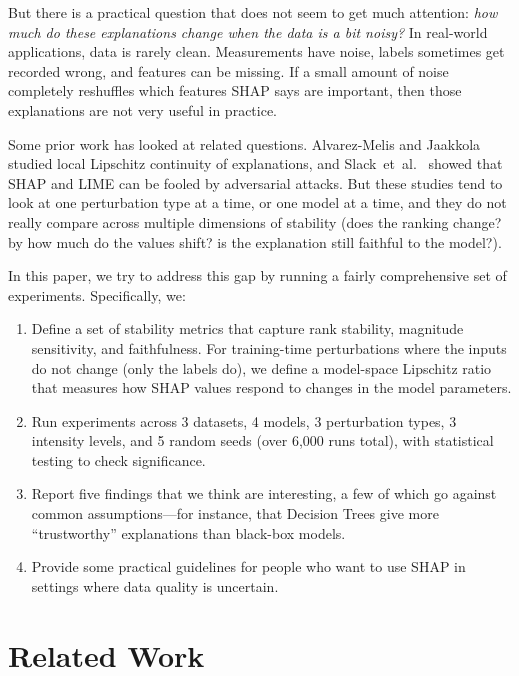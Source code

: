\documentclass[10pt,twocolumn]{article}
\begin{document}
But there is a practical question that does not seem to get much
attention: \emph{how much do these explanations change when the
data is a bit noisy?} In real-world applications, data is rarely
clean. Measurements have noise, labels sometimes get recorded
wrong, and features can be missing. If a small amount of noise
completely reshuffles which features SHAP says are important, then
those explanations are not very useful in practice.

Some prior work has looked at related questions.
Alvarez-Melis and Jaakkola~\cite{alvarez2018robustness} studied
local Lipschitz continuity of explanations, and
Slack~et~al.~\cite{slack2020fooling} showed that SHAP and LIME can
be fooled by adversarial attacks. But these studies tend to look at
one perturbation type at a time, or one model at a time, and they
do not really compare across multiple dimensions of stability
(does the ranking change? by how much do the values shift? is the
explanation still faithful to the model?).

In this paper, we try to address this gap by running a fairly
comprehensive set of experiments. Specifically, we:
\begin{enumerate}[leftmargin=*,topsep=2pt,itemsep=1pt]
  \item Define a set of stability metrics that capture rank
    stability, magnitude sensitivity, and faithfulness. For
    training-time perturbations where the inputs do not change
    (only the labels do), we define a model-space Lipschitz ratio
    that measures how SHAP values respond to changes in the model
    parameters.
  \item Run experiments across 3 datasets, 4 models, 3 perturbation
    types, 3 intensity levels, and 5 random seeds (over 6{,}000
    runs total), with statistical testing to check significance.
  \item Report five findings that we think are interesting, a few
    of which go against common assumptions---for instance, that
    Decision Trees give more ``trustworthy'' explanations than
    black-box models.
  \item Provide some practical guidelines for people who want to
    use SHAP in settings where data quality is uncertain.
\end{enumerate}

\section{Related Work}\label{sec:related}
\end{document}
